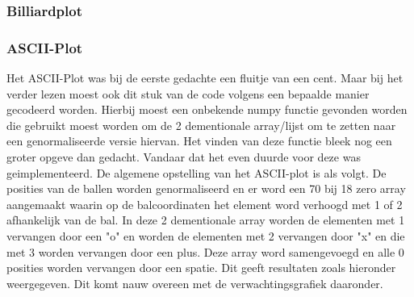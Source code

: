 \documentclass{article}
\begin{document}
\subsubsection{Billiardplot}

\subsubsection{ASCII-Plot}
Het ASCII-Plot was bij de eerste gedachte een fluitje van een cent. Maar bij het verder lezen moest ook dit stuk van de code volgens een bepaalde manier gecodeerd worden. Hierbij moest een onbekende numpy functie gevonden worden die gebruikt moest worden om de 2 dementionale array/lijst om te zetten naar een genormaliseerde versie hiervan. Het vinden van deze functie bleek nog een groter opgeve dan gedacht. Vandaar dat het even duurde voor deze was geimplementeerd. 
De algemene opstelling van het ASCII-plot is als volgt. De posities van de ballen worden genormaliseerd en er word een 70 bij 18 zero array aangemaakt waarin op de balcoordinaten het element word verhoogd met 1 of 2 afhankelijk van de bal. In deze 2 dementionale array worden de elementen met 1 vervangen door een "o" en worden de elementen met 2 vervangen door "x" en die met 3 worden vervangen door een plus. Deze array word samengevoegd en alle 0 posities worden vervangen door een spatie. Dit geeft resultaten zoals hieronder weergegeven. Dit komt nauw overeen met de verwachtingsgrafiek daaronder. 
\end{document}
